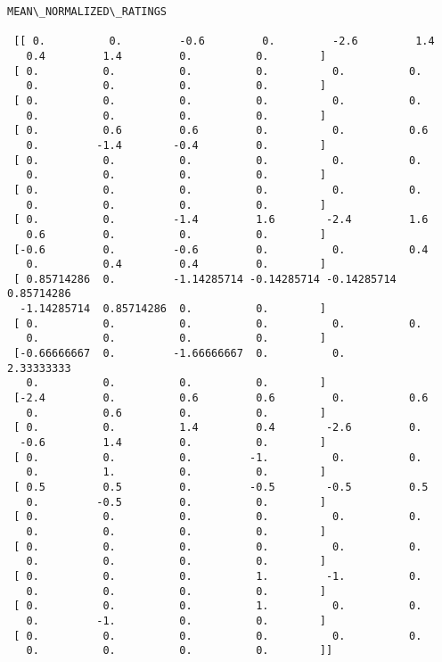 \documentclass[11pt]{article}
\begin{document}
    \begin{Verbatim}[commandchars=\\\{\}]
MEAN\_NORMALIZED\_RATINGS 

 [[ 0.          0.         -0.6         0.         -2.6         1.4
   0.4         1.4         0.          0.        ]
 [ 0.          0.          0.          0.          0.          0.
   0.          0.          0.          0.        ]
 [ 0.          0.          0.          0.          0.          0.
   0.          0.          0.          0.        ]
 [ 0.          0.6         0.6         0.          0.          0.6
   0.         -1.4        -0.4         0.        ]
 [ 0.          0.          0.          0.          0.          0.
   0.          0.          0.          0.        ]
 [ 0.          0.          0.          0.          0.          0.
   0.          0.          0.          0.        ]
 [ 0.          0.         -1.4         1.6        -2.4         1.6
   0.6         0.          0.          0.        ]
 [-0.6         0.         -0.6         0.          0.          0.4
   0.          0.4         0.4         0.        ]
 [ 0.85714286  0.         -1.14285714 -0.14285714 -0.14285714  0.85714286
  -1.14285714  0.85714286  0.          0.        ]
 [ 0.          0.          0.          0.          0.          0.
   0.          0.          0.          0.        ]
 [-0.66666667  0.         -1.66666667  0.          0.          2.33333333
   0.          0.          0.          0.        ]
 [-2.4         0.          0.6         0.6         0.          0.6
   0.          0.6         0.          0.        ]
 [ 0.          0.          1.4         0.4        -2.6         0.
  -0.6         1.4         0.          0.        ]
 [ 0.          0.          0.         -1.          0.          0.
   0.          1.          0.          0.        ]
 [ 0.5         0.5         0.         -0.5        -0.5         0.5
   0.         -0.5         0.          0.        ]
 [ 0.          0.          0.          0.          0.          0.
   0.          0.          0.          0.        ]
 [ 0.          0.          0.          0.          0.          0.
   0.          0.          0.          0.        ]
 [ 0.          0.          0.          1.         -1.          0.
   0.          0.          0.          0.        ]
 [ 0.          0.          0.          1.          0.          0.
   0.         -1.          0.          0.        ]
 [ 0.          0.          0.          0.          0.          0.
   0.          0.          0.          0.        ]]

    \end{Verbatim}
\end{document}
